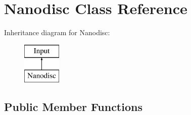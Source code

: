 \hypertarget{class_nanodisc}{}\section{Nanodisc Class Reference}
\label{class_nanodisc}
Inheritance diagram for Nanodisc\+:\begin{figure}[H]
\begin{center}
\leavevmode
\includegraphics[height=2.000000cm]{class_nanodisc}
\end{center}
\end{figure}
\subsection*{Public Member Functions}
